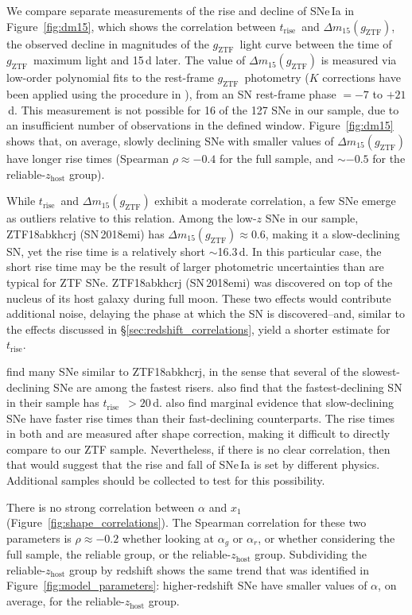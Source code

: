 \documentclass[twocolumn]{./aastex63}
\newcommand{\gztf}{$g_\mathrm{ZTF}$}
\newcommand{\trise}{$t_\mathrm{rise}$}
\begin{document}
We compare separate measurements of the rise and decline of SNe\,Ia in
Figure~\ref{fig:dm15}, which shows the correlation between \trise\ and $\Delta
m_{15}(g_\mathrm{ZTF})$, the observed decline in magnitudes of the \gztf\
light curve between the time of \gztf\ maximum light and 15\,d later. The
value of $\Delta m_{15}(g_\mathrm{ZTF})$ is measured via low-order polynomial
fits to the rest-frame \gztf\ photometry ($K$ corrections have been applied
using the procedure in \citep{Bulla20}), from an SN rest-frame phase $= -7$ to
$+21$\,d. This measurement is not possible for 16 of the 127 SNe in our
sample, due to an insufficient number of observations in the defined window.
Figure~\ref{fig:dm15} shows that, on average, slowly declining SNe with
smaller values of $\Delta m_{15}(g_\mathrm{ZTF})$ have longer rise times
(Spearman $\rho \approx -0.4$ for the full sample, and $\sim$$-0.5$ for the
reliable-$z_\mathrm{host}$ group).

While \trise\ and $\Delta m_{15}(g_\mathrm{ZTF})$ exhibit a moderate
correlation, a few SNe emerge as outliers relative to this relation. Among the
low-$z$ SNe in our sample, ZTF18abkhcrj (SN\,2018emi) has $\Delta
m_{15}(g_\mathrm{ZTF}) \approx 0.6$, making it a slow-declining SN, yet the
rise time is a relatively short $\sim$16.3\,d. In this particular case, the
short rise time may be the result of larger photometric uncertainties than are
typical for ZTF SNe. ZTF18abkhcrj (SN\,2018emi) was discovered on top of the
nucleus of its host galaxy during full moon. These two effects would
contribute additional noise, delaying the phase at which the SN is
discovered--and, similar to the effects discussed in
\S\ref{sec:redshift_correlations}, yield a shorter estimate for \trise.

\citet{Hayden10} find many SNe similar to ZTF18abkhcrj, in the sense that
several of the slowest-declining SNe are among the fastest risers.
\citet{Hayden10} also find that the fastest-declining SN in their sample has
\trise\ $> 20$\,d. \citet{Gonzalez-Gaitan12} also find marginal evidence that
slow-declining SNe have faster rise times than their fast-declining
counterparts. The rise times in both \citet{Hayden10} and
\citet{Gonzalez-Gaitan12} are measured after shape correction, making it
difficult to directly compare to our ZTF sample. Nevertheless, if there is no
clear correlation, then that would suggest that the rise and fall of SNe\,Ia
is set by different physics. Additional samples should be collected to test
for this possibility.

There is no strong correlation between $\alpha$ and $x_1$
(Figure~\ref{fig:shape_correlations}). The Spearman correlation for these two
parameters is $\rho \approx -0.2$ whether looking at $\alpha_g$ or $\alpha_r$,
or whether considering the full sample, the reliable group, or the
reliable-$z_\mathrm{host}$ group. Subdividing the reliable-$z_\mathrm{host}$
group by redshift shows the same trend that was identified in
Figure~\ref{fig:model_parameters}: higher-redshift SNe have smaller values of
$\alpha$, on average, for the reliable-$z_\mathrm{host}$ group.
\end{document}
